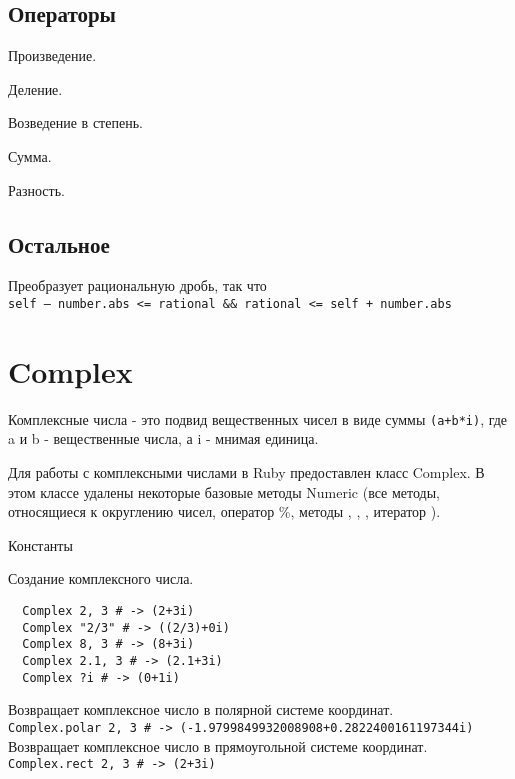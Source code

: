 \subsection*{Операторы} 

\begin{methodlist}
  Произведение. 
 
  Деление. 
 
  Возведение в степень. 
 
  Сумма. 
 
  Разность. 
\end{methodlist}

\subsection*{Остальное} 

\begin{methodlist}
  Преобразует рациональную дробь, так что 
  \\\verb!self – number.abs <= rational && rational <= self + number.abs!
\end{methodlist}

\section{Complex}

Комплексные числа - это подвид вещественных чисел в виде суммы \verb!(a+b*i)!, где a и b - вещественные числа, а i - мнимая единица.

Для работы с комплексными числами в Ruby предоставлен класс Complex. В этом классе удалены некоторые базовые методы Numeric (все методы, относящиеся к округлению чисел, оператор \%, методы , , , итератор ).

\begin{keylist}{Константы}
\end{keylist} 

\begin{methodlist}
  Создание комплексного числа.
  \begin{verbatim}
  Complex 2, 3 # -> (2+3i) 
  Complex "2/3" # -> ((2/3)+0i) 
  Complex 8, 3 # -> (8+3i) 
  Complex 2.1, 3 # -> (2.1+3i) 
  Complex ?i # -> (0+1i)
  \end{verbatim}

  Возвращает комплексное число в полярной системе координат. 
  \\\verb!Complex.polar 2, 3 # -> (-1.9799849932008908+0.2822400161197344i)!
  Возвращает комплексное число в прямоугольной системе координат. 
  \\\verb!Complex.rect 2, 3 # -> (2+3i)!
\end{methodlist}

